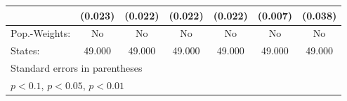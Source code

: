 {\begin{tabular}{l*{6}{c}}
            &     (0.023)         &     (0.022)         &     (0.022)         &     (0.022)         &     (0.007)         &     (0.038)         \\
\hline
Pop.-Weights:&          No         &          No         &          No         &          No         &          No         &          No         \\
States:     &      49.000         &      49.000         &      49.000         &      49.000         &      49.000         &      49.000         \\
\hline\hline
\multicolumn{7}{l}{\footnotesize Standard errors in parentheses}\\
\multicolumn{7}{l}{\footnotesize \sym{*} \(p<0.1\), \sym{**} \(p<0.05\), \sym{***} \(p<0.01\)}\\
\end{tabular}
}
